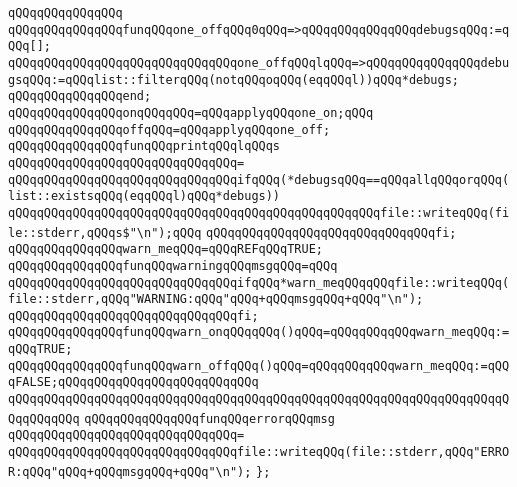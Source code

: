 \verb|qQQqqQQqqQQqqQQq|\newline
\verb|qQQqqQQqqQQqqQQqfunqQQqone_offqQQq0qQQq=>qQQqqQQqqQQqqQQqdebugsqQQq:=qQQq[];|\newline
\verb|qQQqqQQqqQQqqQQqqQQqqQQqqQQqqQQqone_offqQQqlqQQq=>qQQqqQQqqQQqqQQqdebugsqQQq:=qQQqlist::filterqQQq(notqQQqoqQQq(eqqQQql))qQQq*debugs;|\newline
\verb|qQQqqQQqqQQqqQQqend;|\newline
\newline
\verb|qQQqqQQqqQQqqQQqonqQQqqQQq=qQQqapplyqQQqone_on;qQQq|\newline
\verb|qQQqqQQqqQQqqQQqoffqQQq=qQQqapplyqQQqone_off;|\newline
\newline
\verb|qQQqqQQqqQQqqQQqfunqQQqprintqQQqlqQQqs|\newline
\verb|qQQqqQQqqQQqqQQqqQQqqQQqqQQqqQQq=|\newline
\verb|qQQqqQQqqQQqqQQqqQQqqQQqqQQqqQQqifqQQq(*debugsqQQq==qQQqallqQQqorqQQq(list::existsqQQq(eqqQQql)qQQq*debugs))|\newline
\newline
\verb|qQQqqQQqqQQqqQQqqQQqqQQqqQQqqQQqqQQqqQQqqQQqqQQqqQQqfile::writeqQQq(file::stderr,qQQqs$"\n");qQQq|\newline
\verb|qQQqqQQqqQQqqQQqqQQqqQQqqQQqqQQqfi;|\newline
\newline
\verb|qQQqqQQqqQQqqQQqwarn_meqQQq=qQQqREFqQQqTRUE;|\newline
\newline
\verb|qQQqqQQqqQQqqQQqfunqQQqwarningqQQqmsgqQQq=qQQq|\newline
\verb|qQQqqQQqqQQqqQQqqQQqqQQqqQQqqQQqifqQQq*warn_meqQQqqQQqfile::writeqQQq(file::stderr,qQQq"WARNING:qQQq"qQQq+qQQqmsgqQQq+qQQq"\n");|\newline
\verb|qQQqqQQqqQQqqQQqqQQqqQQqqQQqqQQqfi;|\newline
\newline
\verb|qQQqqQQqqQQqqQQqfunqQQqwarn_onqQQqqQQq()qQQq=qQQqqQQqqQQqwarn_meqQQq:=qQQqTRUE;|\newline
\verb|qQQqqQQqqQQqqQQqfunqQQqwarn_offqQQq()qQQq=qQQqqQQqqQQqwarn_meqQQq:=qQQqFALSE;qQQqqQQqqQQqqQQqqQQqqQQqqQQq|\newline
\verb|qQQqqQQqqQQqqQQqqQQqqQQqqQQqqQQqqQQqqQQqqQQqqQQqqQQqqQQqqQQqqQQqqQQqqQQqqQQqqQQq|\newline
\verb|qQQqqQQqqQQqqQQqfunqQQqerrorqQQqmsg|\newline
\verb|qQQqqQQqqQQqqQQqqQQqqQQqqQQqqQQq=|\newline
\verb|qQQqqQQqqQQqqQQqqQQqqQQqqQQqqQQqfile::writeqQQq(file::stderr,qQQq"ERROR:qQQq"qQQq+qQQqmsgqQQq+qQQq"\n");|\newline
\newline
\verb|};|\newline
\newline


